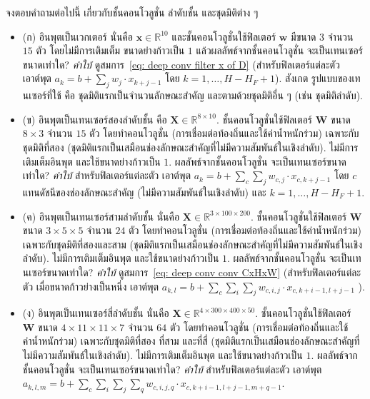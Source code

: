 \begin{Exercise}
\label{ex: convolution}

จงตอบคำถามต่อไปนี้ เกี่ยวกับชั้นคอนโวลูชั่น ลำดับชั้น และชุดมิติต่าง ๆ 
\begin{itemize}
\item (ก) อินพุตเป็นเวกเตอร์ นั่นคือ $\bm{x} \in \mathbb{R}^{10}$
และชั้นคอนโวลูชั่นใช้ฟิลเตอร์ $\bm{w}$ มีขนาด $3$ จำนวน $15$ ตัว โดยไม่มีการเติมเต็ม
ขนาดย่างก้าวเป็น $1$ แล้วผลลัพธ์จากชั้นคอนโวลูชั่น จะเป็นเทนเซอร์ขนาดเท่าใด?
\textit{คำใบ้} 
ดูสมการ~\ref{eq: deep conv filter x of D}
(สำหรับฟิลเตอร์แต่ละตัว เอาต์พุต $a_k = b + \sum_j w_j \cdot x_{k+j-1}$ โดย $k = 1, \ldots, H - H_F + 1$).
สังเกต รูปแบบของเทนเซอร์ที่ใช้ คือ ชุดมิติแรกเป็นจำนวนลักษณะสำคัญ และตามด้วยชุดมิติอื่น ๆ (เช่น ชุดมิติลำดับ).
 
\item (ข) อินพุตเป็นเทนเซอร์สองลำดับชั้น คือ $\bm{X} \in \mathbb{R}^{8 \times 10}$.
ชั้นคอนโวลูชั่นใช้ฟิลเตอร์ $\bm{W}$ ขนาด $8 \times 3$ จำนวน $15$ ตัว
โดยทำคอนโวลูชั่น (การเชื่อมต่อท้องถิ่นและใช้ค่าน้ำหนักร่วม) เฉพาะกับชุดมิติที่สอง (ชุดมิติแรกเป็นเสมือนช่องลักษณะสำคัญที่ไม่มีความสัมพันธ์ในเชิงลำดับ).
ไม่มีการเติมเต็มอินพุต และใช้ขนาดย่างก้าวเป็น $1$.
ผลลัพธ์จากชั้นคอนโวลูชั่น จะเป็นเทนเซอร์ขนาดเท่าใด?
\textit{คำใบ้}
สำหรับฟิลเตอร์แต่ละตัว
เอาต์พุต $a_k = b + \sum_c \sum_j w_{c, j} \cdot x_{c, k+j-1}$ 
โดย $c$ แทนดัชนีของช่องลักษณะสำคัญ (ไม่มีความสัมพันธ์ในเชิงลำดับ)
และ $k = 1, \ldots, H - H_F + 1$.

\item (ค) อินพุตเป็นเทนเซอร์สามลำดับชั้น นั่นคือ $\bm{X} \in \mathbb{R}^{3 \times 100 \times 200}$.
ชั้นคอนโวลูชั่นใช้ฟิลเตอร์ $\bm{W}$ ขนาด $3 \times 5 \times 5$ จำนวน $24$ ตัว
โดยทำคอนโวลูชั่น (การเชื่อมต่อท้องถิ่นและใช้ค่าน้ำหนักร่วม) เฉพาะกับชุดมิติที่สองและสาม
(ชุดมิติแรกเป็นเสมือนช่องลักษณะสำคัญที่ไม่มีความสัมพันธ์ในเชิงลำดับ).
ไม่มีการเติมเต็มอินพุต และใช้ขนาดย่างก้าวเป็น $1$.
ผลลัพธ์จากชั้นคอนโวลูชั่น จะเป็นเทนเซอร์ขนาดเท่าใด?
\textit{คำใบ้} 
ดูสมการ~\ref{eq: deep conv conv CxHxW}
(สำหรับฟิลเตอร์แต่ละตัว เมื่อขนาดก้าวย่างเป็นหนึ่ง
เอาต์พุต
$a_{k,l} = b + \sum_{c} \sum_{i} \sum_{j} w_{c,i,j} \cdot x_{c, k+i-1, l+j-1}$%
). 

\item (ง) อินพุตเป็นเทนเซอร์สี่ลำดับชั้น นั่นคือ $\bm{X} \in \mathbb{R}^{4 \times 300 \times 400 \times 50}$.
ชั้นคอนโวลูชั่นใช้ฟิลเตอร์ $\bm{W}$ ขนาด $4 \times 11 \times 11 \times 7$ จำนวน $64$ ตัว
โดยทำคอนโวลูชั่น (การเชื่อมต่อท้องถิ่นและใช้ค่าน้ำหนักร่วม) เฉพาะกับชุดมิติที่สอง ที่สาม และที่สี่
(ชุดมิติแรกเป็นเสมือนช่องลักษณะสำคัญที่ไม่มีความสัมพันธ์ในเชิงลำดับ).
ไม่มีการเติมเต็มอินพุต และใช้ขนาดย่างก้าวเป็น $1$.
ผลลัพธ์จากชั้นคอนโวลูชั่น จะเป็นเทนเซอร์ขนาดเท่าใด?
\textit{คำใบ้} 
สำหรับฟิลเตอร์แต่ละตัว 
เอาต์พุต
$a_{k,l,m} = b + \sum_{c} \sum_{i} \sum_{j} \sum_{q} w_{c,i,j,q} \cdot x_{c, k+i-1, l+j-1, m+q-1}$.

\end{itemize}

\end{Exercise}

